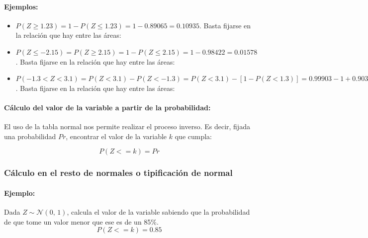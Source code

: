 \paragraph{Ejemplos:}
\begin{itemize}
    \item $P\left(Z\geq 1.23 \right)= 1 - P\left(Z\leq 1.23 \right) = 1 - 0.89065= 0.10935$. Basta fijarse en la relación que hay entre las áreas: 
    \begin{center}
        
        
        
    \end{center}
    \item  $P\left(Z\leq -2.15 \right)=P\left(Z\geq 2.15 \right)=1-P\left(Z\leq 2.15 \right)=1-0.98422=0.01578$. Basta fijarse en la relación que hay entre las áreas: 
    \begin{center}
        
    \end{center}
    \item $P\left( -1.3 < Z < 3.1\right)=P\left( Z < 3.1\right)-P\left(  Z < -1.3\right)=
    P\left( Z < 3.1\right) - \left[ 1 - P\left(  Z < 1.3\right) \right]= 0.99903 - 1 + 0.9032 = 0.90223$. Basta fijarse en la relación que hay entre las áreas:
    \begin{center}
        
        
        
    \end{center}
    
     
\end{itemize}

\paragraph{Cálculo del valor de la variable a partir de la probabilidad:} El uso de la tabla normal nos permite realizar el proceso inverso. Es decir, fijada una probabilidad $Pr$, encontrar el valor de la variable $k$ que cumpla:

$$P(Z<=k)=Pr$$
    \begin{center}
        
    \end{center}
\subsubsection{Cálculo en el resto de normales o tipificación de normal}

\paragraph{Ejemplo:} Dada $Z \sim \mathcal{N}(0,\,1)$, calcula el valor de la variable sabiendo que la probabilidad de que tome un valor menor que ese es de un 85\%. 
$$P(Z<=k)=0.85$$
    \begin{center}
        
    \end{center}

